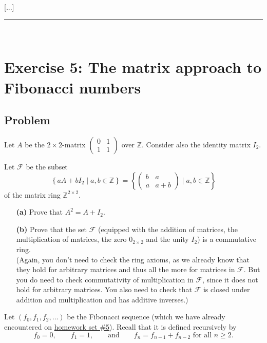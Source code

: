 \documentclass[paper=a4, fontsize=12pt]{scrartcl} %
\newcommand{\ZZ}{\mathbb{Z}} %
\newcommand{\set}[1]{\left\{ #1 \right\}}
\newcommand{\tup}[1]{\left( #1 \right)}
\newcommand{\calF}{\mathcal{F}}
\newcommand{\horrule}[1]{\rule{\linewidth}{#1}} %
\theoremstyle{plainsl}
\theoremstyle{definition}
\theoremstyle{remark}
\begin{document}
[...]

\horrule{0.3pt} \\[0.4cm]

\section{Exercise 5: The matrix approach to Fibonacci numbers}

\subsection{Problem}

Let $A$ be the $2 \times 2$-matrix
$\begin{pmatrix}
  0 & 1 \\
  1 & 1
 \end{pmatrix}$
over $\ZZ$.
Consider also the identity matrix $I_2$.

Let $\calF$ %
be the subset
\[
 \set{ aA + bI_2 \mid a, b \in \ZZ }
 =
 \set{ \begin{pmatrix} b & a \\ a & a+b \end{pmatrix} \mid a, b \in \ZZ }
\]
of the matrix ring $\ZZ^{2 \times 2}$.

\begin{enumerate}

\item[\textbf{(a)}]
Prove that $A^2 = A + I_2$.

\item[\textbf{(b)}]
Prove that the set $\calF$ (equipped with the addition of matrices,
the multiplication of matrices, the zero $0_{2 \times 2}$ and
the unity $I_2$) is a commutative ring. \\
(Again, you don't need to check the ring axioms, as we already
know that they hold for arbitrary matrices and thus all the more
for matrices in $\calF$.
But you do need to check commutativity of multiplication in
$\calF$, since it does not hold for arbitrary matrices.
You also need to check that $\calF$ is closed under addition
and multiplication and has additive inverses.)

\end{enumerate}

Let $\tup{f_0, f_1, f_2, \ldots}$ be the Fibonacci sequence (which
we have already encountered on
\href{http://www.cip.ifi.lmu.de/~grinberg/t/19s/hw5s.pdf}{homework set \#5}).
Recall that it is defined recursively by
\[
f_0 = 0, \qquad
f_1 = 1, \qquad \text{and} \qquad
f_n = f_{n-1} + f_{n-2} \text{ for all } n \geq 2 .
\]
\end{document}
